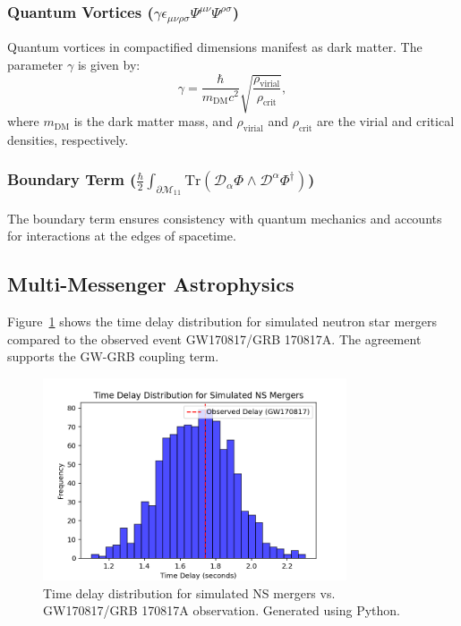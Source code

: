 \documentclass[12pt, a4paper]{article}
\begin{document}
\subsubsection{Quantum Vortices ($\gamma \epsilon_{\mu\nu\rho\sigma} \Psi^{\mu\nu} \Psi^{\rho\sigma}$)}
Quantum vortices in compactified dimensions manifest as dark matter. The parameter $\gamma$ is given by:
\[
\gamma = \frac{\hbar}{m_{\text{DM}} c^2} \sqrt{\frac{\rho_{\text{virial}}}{\rho_{\text{crit}}}},
\]
where $m_{\text{DM}}$ is the dark matter mass, and $\rho_{\text{virial}}$ and $\rho_{\text{crit}}$ are the virial and critical densities, respectively.

\subsubsection{Boundary Term ($\frac{\hbar}{2} \int_{\partial\mathcal{M}_{11}} \text{Tr}\left( \mathcal{D}_\alpha \Phi \wedge \mathcal{D}^\alpha \Phi^\dagger \right)$)}
The boundary term ensures consistency with quantum mechanics and accounts for interactions at the edges of spacetime.


\subsection{Multi-Messenger Astrophysics}
Figure~\ref{fig:gw_grb_delay} shows the time delay distribution for simulated neutron star mergers compared to the observed event GW170817/GRB 170817A. The agreement supports the GW-GRB coupling term.

\begin{figure}[h]
\centering
\includegraphics[width=0.8\textwidth]{gw_grb_delay.png}
\caption{Time delay distribution for simulated NS mergers vs. GW170817/GRB 170817A observation. Generated using Python.}
\label{fig:gw_grb_delay}
\end{figure}
\end{document}
